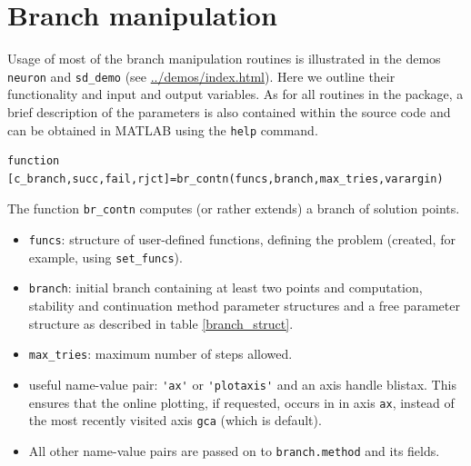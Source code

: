 \documentclass[10pt]{scrartcl}
\newcommand{\demobase}{\url{../demos/index.html}}
\newcommand{\blist}[1]{\mbox{\lstinline!#1!}}
\begin{document}
{\section{Branch manipulation}\label{branch_manipulation}

Usage of most of the branch manipulation routines is illustrated in
the demos \texttt{neuron} and \texttt{sd\_demo} (see
\demobase{}).  Here we outline their functionality and
input and output variables.  As for all routines in the package, a
brief description of the parameters is also contained within the
source code and can be obtained in MATLAB using the \blist{help}
command.
\begin{lstlisting}
function [c_branch,succ,fail,rjct]=br_contn(funcs,branch,max_tries,varargin)  
\end{lstlisting}
\noindent The function \blist{br_contn} computes (or rather 
extends) a branch of solution
points. 
\begin{itemize}
\item \blist{funcs}: structure of user-defined functions, defining the
  problem (created, for example, using \blist{set_funcs}).
\item \blist{branch}: initial branch 
containing at least two points and computation, stability and 
continuation method parameter
structures and a free parameter structure as described in 
table \ref{branch_struct}. 
\item \blist{max_tries}:
maximum number of steps allowed.
\item useful name-value pair: \blist{'ax'} or \blist{'plotaxis'} and
  an axis handle blist{ax}. This ensures that the online plotting, if requested,
  occurs in in axis \blist{ax}, instead of the most recently visited axis \blist{gca} (which is default).
\item All other name-value pairs are passed on to
  \blist{branch.method} and its fields.

\end{itemize}}
\end{document}
